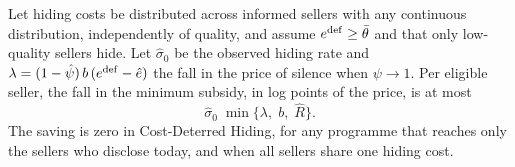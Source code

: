 \label{prop:att_saving}
Let hiding costs be distributed across informed sellers with any continuous distribution, independently of quality, and assume $e^{\rm def}\ge\bar\theta$ and that only low-quality sellers hide. Let $\hat\sigma_0$ be the observed hiding rate and $\lambda=(1-\hat\psi)\,b\,(e^{\rm def}-\hat e)$ the fall in the price of silence when $\psi\to1$. Per eligible seller, the fall in the minimum subsidy, in log points of the price, is at most
\[
    \hat\sigma_0\;\min\{\lambda,\;b,\;\hat R\}.
\]
The saving is zero in Cost-Deterred Hiding, for any programme that reaches only the sellers who disclose today, and when all sellers share one hiding cost.
